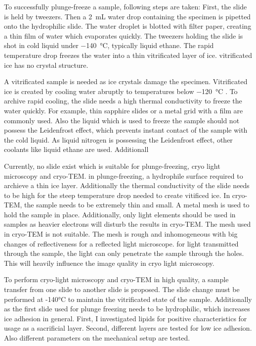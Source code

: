 To successfully plunge-freeze a sample, following steps are taken: First, the slide is held by tweezers. Then a \SI{2}{\milli\liter} water drop containing the specimen is pipetted onto the hydrophilic slide. The water droplet is blotted with filter paper, creating a thin film of water which evaporates quickly. The tweezers holding the slide is shot in cold liquid under \SI{-140}{\degreeCelsius}, typically liquid ethane. The rapid temperature drop freezes the water into a thin vitrificated layer of ice. vitrificated ice has no crystal structure.

A vitrificated sample is needed as ice crystals damage the specimen. Vitrificated ice is created by cooling water abruptly to temperatures below \SI{-120}{\degreeCelsius} \cite{Wowk.2010}. To archive rapid cooling, the slide needs a high thermal conductivity to freeze the water quickly. For example, thin sapphire slides or a metal grid with a film are commonly used. Also the liquid which is used to freeze the sample should not possess the Leidenfrost effect, which prevents instant contact of the sample with the cold liquid. As liquid nitrogen is possessing the Leidenfrost effect, other coolants like liquid ethane are used. Additionall

Currently, no slide exist which is suitable for plunge-freezing, cryo light microscopy and cryo-TEM. in plunge-freezing, a hydrophile surface required to archieve a thin ice layer. Additionally the thermal conductivity of the slide needs to be high for the steep temperature drop needed to create vitificed ice. In cryo-TEM, the sample needs to be extremely thin and small. A metal mesh is used to hold the sample in place. Additionally, only light elements should be used in samples as heavier electrons will disturb the results in cryo-TEM. The mesh used in cryo-TEM is not suitable. The mesh is rough and inhomogeneous with big changes of reflectiveness for a reflected light microscope. for light transmitted through the sample, the light can only penetrate the sample through the holes. This will heavily influence the image quality in cryo light microscopy.
 
To perform cryo-light microscopy and cryo-TEM in high quality, a sample transfer from one slide to another slide is proposed. The slide change must be performed at -140°C to maintain the vitrificated state of the sample. Additionally as the first slide used for plunge freezing needs to be hydrophilic, which increases ice adhesion in general. First, I investigated lipids for positive characteristics for usage as a sacrificial layer. Second, different layers are tested for low ice adhesion. Also different parameters on the mechanical setup are tested.

